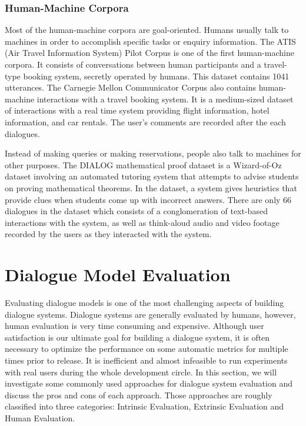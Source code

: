 \documentclass[bsc,frontabs,twoside,singlespacing,parskip,deptreport]{infthesis}     %
\begin{document}
\subsubsection*{Human-Machine Corpora}

Most of the human-machine corpora are goal-oriented. Humans usually talk to machines in order to accomplish specific tasks or enquiry information. The ATIS (Air Travel Information System) Pilot Corpus\cite{hemphill1990atis} is one of the first human-machine corpora. It consists of conversations between human participants and a travel-type booking system, secretly operated by humans. This dataset contains 1041 utterances. The Carnegie Mellon Communicator Corpus\cite{bennett2002carnegie} also contains human-machine interactions with a travel booking system. It is a medium-sized dataset of interactions with a real time system providing flight information, hotel information, and car rentals. The user’s comments are recorded after the each dialogues.

Instead of making queries or making reservations, people also talk to machines for other purposes. The DIALOG mathematical proof dataset\cite{wolska2004annotated} is a Wizard-of-Oz dataset involving an automated tutoring system that attempts to advise students on proving mathematical theorems. In the dataset, a system gives heuristics that provide clues when students come up with incorrect answers. There are only 66 dialogues in the dataset which consists of a conglomeration of text-based interactions with the system, as well as think-aloud audio and video footage recorded by the users as they interacted with the system. 


\section{Dialogue Model Evaluation}

Evaluating dialogue models is one of the most challenging aspects of building dialogue systems. Dialogue systems are generally evaluated by humans, however, human evaluation is very time consuming and expensive. Although user satisfaction is our ultimate goal for building a dialogue system, it is often necessary to optimize the performance on some automatic metrics for multiple times prior to release. It is inefficient and almost infeasible to run experiments with real users during the whole development circle. In this section, we will investigate some commonly used approaches for dialogue system evaluation and discuss the pros and cons of each approach. Those approaches are roughly classified into three categories: Intrinsic Evaluation, Extrinsic Evaluation and Human Evaluation.
\end{document}
